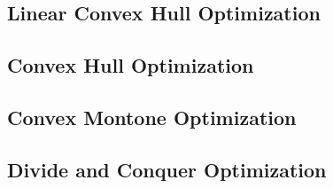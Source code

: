 \documentclass[a4paper,10pt,twocolumn,oneside]{article}
\begin{document}
\subsection{Linear Convex Hull Optimization}

\subsection{Convex Hull Optimization}

\subsection{Convex Montone Optimization}

\subsection{Divide and Conquer Optimization}

\end{document}
